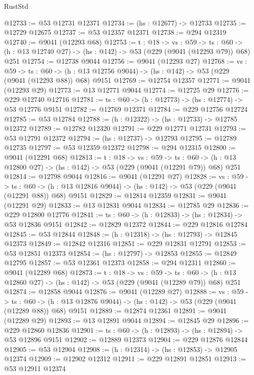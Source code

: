 \begin{lexlean}{RustStd}
\begin{coremodule}
@12733 := @53 @12731 @12371
@12734 := (hs : @12677) -> @12733
@12735 := @12729 @12675
@12737 := @53 @12357 @12371
@12738 := @294 @12319
@12740 := @9041 (@12293 @68)
@12753 := {t : @18} ->
  {vs : @59} ->
  {ts : @60} -> (h : @13 @12740 @27) -> (hs : @142) -> @53 (@229 (@9041 (@12293 @79)) @68) @251
@12754 := @12738 @9044
@12756 := @9041 (@12293 @27)
@12768 := {vs : @59} ->
  {ts : @60} -> (h : @13 @12756 @9044) -> (hs : @142) -> @53 (@229 (@9041 (@12293 @88)) @68) @9151
@12769 := @12754 @12357
@12771 := @9041 (@12293 @29)
@12773 := @13 @12771 @9044
@12774 := @12725 @29
@12776 := @229 @12740 @12716
@12781 := {ts : @60} -> (h : @12773) -> (hs : @12774) -> @53 @12776 @9151
@12782 := @12769 @12371
@12784 := @229 @12756 @12724
@12785 := @53 @12784
@12788 := (h : @12322) -> (hs : @12733) -> @12785 @12372
@12789 := @12782 @12320
@12791 := @229 @12771 @12731
@12793 := @53 @12791 @12372
@12794 := (hs : @12737) -> @12793
@12795 := @12789 @12735
@12797 := @53 @12359 @12372
@12798 := @294 @12315
@12800 := @9041 (@12291 @68)
@12813 := {t : @18} ->
  {vs : @59} ->
  {ts : @60} -> (h : @13 @12800 @27) -> (hs : @142) -> @53 (@229 (@9041 (@12291 @79)) @68) @251
@12814 := @12798 @9044
@12816 := @9041 (@12291 @27)
@12828 := {vs : @59} ->
  {ts : @60} -> (h : @13 @12816 @9044) -> (hs : @142) -> @53 (@229 (@9041 (@12291 @88)) @68) @9151
@12829 := @12814 @12359
@12831 := @9041 (@12291 @29)
@12833 := @13 @12831 @9044
@12834 := @12785 @29
@12836 := @229 @12800 @12776
@12841 := {ts : @60} -> (h : @12833) -> (hs : @12834) -> @53 @12836 @9151
@12842 := @12829 @12372
@12844 := @229 @12816 @12784
@12845 := @53 @12844
@12848 := (h : @12318) -> (hs : @12793) -> @12845 @12373
@12849 := @12842 @12316
@12851 := @229 @12831 @12791
@12853 := @53 @12851 @12373
@12854 := (hs : @12797) -> @12853
@12855 := @12849 @12795
@12857 := @53 @12361 @12373
@12858 := @294 @12311
@12860 := @9041 (@12289 @68)
@12873 := {t : @18} ->
  {vs : @59} ->
  {ts : @60} -> (h : @13 @12860 @27) -> (hs : @142) -> @53 (@229 (@9041 (@12289 @79)) @68) @251
@12874 := @12858 @9044
@12876 := @9041 (@12289 @27)
@12888 := {vs : @59} ->
  {ts : @60} -> (h : @13 @12876 @9044) -> (hs : @142) -> @53 (@229 (@9041 (@12289 @88)) @68) @9151
@12889 := @12874 @12361
@12891 := @9041 (@12289 @29)
@12893 := @13 @12891 @9044
@12894 := @12845 @29
@12896 := @229 @12860 @12836
@12901 := {ts : @60} -> (h : @12893) -> (hs : @12894) -> @53 @12896 @9151
@12902 := @12889 @12373
@12904 := @229 @12876 @12844
@12905 := @53 @12904
@12908 := (h : @12314) -> (hs : @12853) -> @12905 @12374
@12909 := @12902 @12312
@12911 := @229 @12891 @12851
@12913 := @53 @12911 @12374

\end{coremodule}
\end{lexlean}
